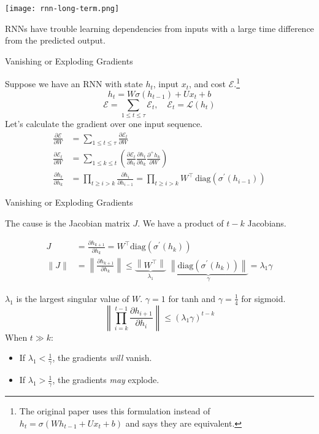 \documentclass[english]{article}
\begin{document}
\begin{center}
\texttt{[image: rnn-long-term.png]} 
\end{center}

RNNs have trouble learning dependencies from inputs with a large time difference from the predicted output.
 

\item 
 {Vanishing or Exploding Gradients}

Suppose we have an RNN with state $h_t$, input $x_t$, and cost $\mathcal{E}$.\footnote{The original paper uses this formulation instead of $h_t=\sigma(Wh_{t-1}+Ux_t+b)$ and says they are equivalent.}
$$h_t = W\sigma(h_{t-1})+Ux_t+b$$
$$\mathcal{E}=\sum_{1\leq t\leq \tau}\mathcal{E}_t,\quad \mathcal{E}_t=\mathcal{L}(h_t)$$
Let's calculate the gradient over one input sequence.
\begin{align*}
\frac{\partial\mathcal{E}}{\partial W} &= \sum_{1\leq t\leq\tau} \frac{\partial\mathcal{E}_t}{\partial W}\\
\frac{\partial\mathcal{E}_t}{\partial W} &= \sum_{1\leq k \leq t} \left(\frac{\partial\mathcal{E}_t}{\partial h_t}\frac{\partial h_t}{\partial h_k}\frac{\partial^+h_k}{\partial W}\right)\\
\frac{\partial h_t}{\partial h_k} &= \prod_{t\geq i>k}\frac{\partial h_i}{\partial h_{i-1}}=\prod_{t\geq i>k} {W}^\top\,\text{diag}(\sigma^\prime(h_{i-1}))
\end{align*}
 

\item 
 {Vanishing or Exploding Gradients}

The cause is the Jacobian matrix $J$. We have a product of $t-k$ Jacobians.

\begin{align*}
J&=\frac{\partial h_{k+1}}{\partial h_k}=W^\top\text{diag}(\sigma^\prime(h_k))\\
\|J\|&=\left\|\frac{\partial h_{k+1}}{\partial h_k}\right\|\leq\underbrace{\left\|W^\top\right\|}_{\lambda_1}\;\underbrace{\left\|\text{diag}(\sigma^\prime(h_k))\right\|}_{\gamma}=\lambda_1\gamma
\end{align*}

$\lambda_1$ is the largest singular value of $W$. $\gamma=1$ for tanh and $\gamma=\frac{1}{4}$ for sigmoid.
$$\left\|\prod_{i=k}^{t-1}\frac{\partial h_{i+1}}{\partial h_i}\right\| \leq (\lambda_1\gamma)^{t-k}$$
When $t \gg k$:
\begin{itemize}
\item
If $\lambda_1<\frac{1}{\gamma}$, the gradients \textit{will} vanish.
\item
If $\lambda_1>\frac{1}{\gamma}$, the gradients \textit{may} explode.
\end{itemize}
 
\end{document}

